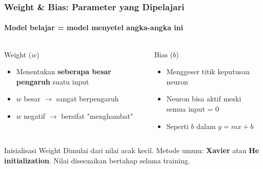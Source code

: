 \documentclass[t,aspectratio=169,xcolor=dvipsnames]{beamer}
\begin{document}
\begin{frame}
    \frametitle{Weight \& Bias: Parameter yang Dipelajari}
    \framesubtitle{Model belajar = model menyetel angka-angka ini}
    \footnotesize
    \begin{columns}[T]
        \begin{block}{Weight ($w$)}
            \begin{itemize}
                \item Menentukan \textbf{seberapa besar pengaruh} suatu input
                \item $w$ besar $\rightarrow$ sangat berpengaruh
                \item $w$ negatif $\rightarrow$ bersifat "menghambat"
            \end{itemize}
        \end{block}

        \begin{exampleblock}{Bias ($b$)}
            \begin{itemize}
                \item Menggeser titik keputusan neuron
                \item Neuron bisa aktif meski semua input = 0
                \item Seperti $b$ dalam $y = mx + b$
            \end{itemize}
        \end{exampleblock}
    \end{columns}

    \vspace{0.3em}
    \begin{alertblock}{Inisialisasi Weight}
        Dimulai dari nilai acak kecil. Metode umum: \textbf{Xavier} atau \textbf{He initialization}. Nilai disesuaikan bertahap selama training.
    \end{alertblock}
\end{frame}
\end{document}
